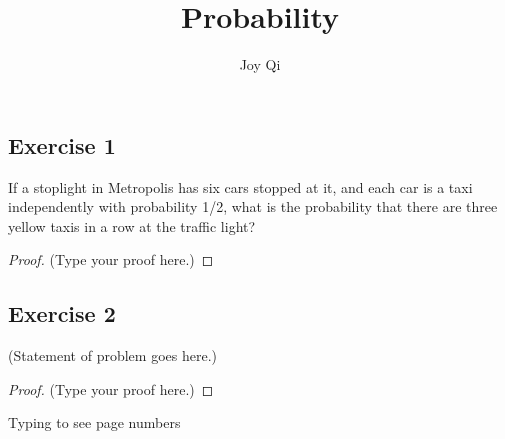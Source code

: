 \documentclass[12pt]{article}
\title{Probability}
\author{Joy Qi}
\begin{document}
\maketitle

\vspace{0.5in}



\subsection*{Exercise 1}
If a stoplight in Metropolis has six cars stopped at it, and each car is a taxi independently with probability 1/2, what is the probability that there are three yellow taxis in a row at the traffic light?\\

\begin{proof}
(Type your proof here.)
\end{proof}

\vspace{2in} %


\subsection*{Exercise 2}
(Statement of problem goes here.)\\

\begin{proof}
(Type your proof here.)
\end{proof}

\vspace{2in} %

\vspace{3in}
Typing to see page numbers
\end{document}
